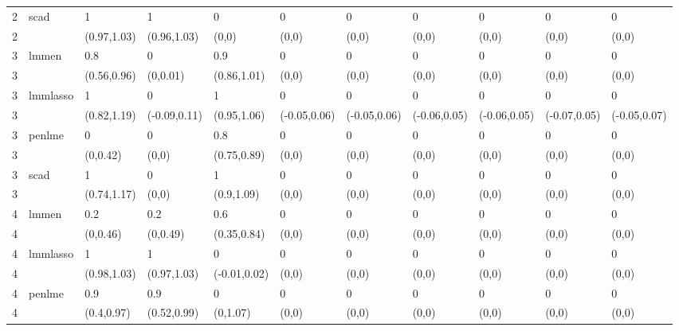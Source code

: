 \begin{table}[ht]
\begin{tabular}{lllllllllll}
  2 & \multirow{2}{*}{scad} & 1 & 1 & 0 & 0 & 0 & 0 & 0 & 0 & 0 \\ 
  2 &  & (0.97,1.03) & (0.96,1.03) & (0,0) & (0,0) & (0,0) & (0,0) & (0,0) & (0,0) & (0,0) \\ 
  3 & \multirow{2}{*}{lmmen} & 0.8 & 0 & 0.9 & 0 & 0 & 0 & 0 & 0 & 0 \\ 
  3 &  & (0.56,0.96) & (0,0.01) & (0.86,1.01) & (0,0) & (0,0) & (0,0) & (0,0) & (0,0) & (0,0) \\ 
  3 & \multirow{2}{*}{lmmlasso} & 1 & 0 & 1 & 0 & 0 & 0 & 0 & 0 & 0 \\ 
  3 &  & (0.82,1.19) & (-0.09,0.11) & (0.95,1.06) & (-0.05,0.06) & (-0.05,0.06) & (-0.06,0.05) & (-0.06,0.05) & (-0.07,0.05) & (-0.05,0.07) \\ 
  3 & \multirow{2}{*}{penlme} & 0 & 0 & 0.8 & 0 & 0 & 0 & 0 & 0 & 0 \\ 
  3 &  & (0,0.42) & (0,0) & (0.75,0.89) & (0,0) & (0,0) & (0,0) & (0,0) & (0,0) & (0,0) \\ 
  3 & \multirow{2}{*}{scad} & 1 & 0 & 1 & 0 & 0 & 0 & 0 & 0 & 0 \\ 
  3 &  & (0.74,1.17) & (0,0) & (0.9,1.09) & (0,0) & (0,0) & (0,0) & (0,0) & (0,0) & (0,0) \\ 
  4 & \multirow{2}{*}{lmmen} & 0.2 & 0.2 & 0.6 & 0 & 0 & 0 & 0 & 0 & 0 \\ 
  4 &  & (0,0.46) & (0,0.49) & (0.35,0.84) & (0,0) & (0,0) & (0,0) & (0,0) & (0,0) & (0,0) \\ 
  4 & \multirow{2}{*}{lmmlasso} & 1 & 1 & 0 & 0 & 0 & 0 & 0 & 0 & 0 \\ 
  4 &  & (0.98,1.03) & (0.97,1.03) & (-0.01,0.02) & (0,0) & (0,0) & (0,0) & (0,0) & (0,0) & (0,0) \\ 
  4 & \multirow{2}{*}{penlme} & 0.9 & 0.9 & 0 & 0 & 0 & 0 & 0 & 0 & 0 \\ 
  4 &  & (0.4,0.97) & (0.52,0.99) & (0,1.07) & (0,0) & (0,0) & (0,0) & (0,0) & (0,0) & (0,0) \\ 
   \hline
\end{tabular}
\end{table}
